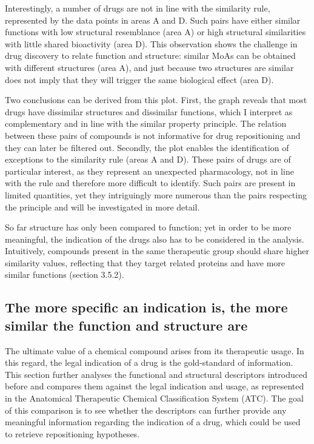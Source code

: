 Interestingly, a number of drugs are not in line with the similarity rule, represented by the data points in areas A and D. Such pairs have either similar functions with low structural resemblance (area A) or high structural similarities with little shared bioactivity (area D). This observation shows the challenge in drug discovery to relate function and structure: similar MoAs can be obtained with different structures (area A), and just because two structures are similar does not imply that they will trigger the same biological effect (area D).

Two conclusions can be derived from this plot. First, the graph reveals that most drugs have dissimilar structures and dissimilar functions, which I interpret as complementary and in line with the similar property principle. The relation between these pairs of compounds is not informative for drug repositioning and they can later be filtered out. Secondly, the plot enables the identification of exceptions to the similarity rule (areas A and D). These pairs of drugs are of particular interest, as they represent an unexpected pharmacology, not in line with the rule and therefore more difficult to identify. Such pairs are present in limited quantities, yet they intriguingly more numerous than the pairs respecting the principle and will be investigated in more detail.

So far structure has only been compared to function; yet in order to be more meaningful, the indication of the drugs also has to be considered in the analysis. Intuitively, compounds present in the same therapeutic group should share higher similarity values, reflecting that they target related proteins and have more similar functions (section 3.5.2).

\subsection{The more specific an indication is, the more similar the function and structure are}
The ultimate value of a chemical compound arises from its therapeutic usage. In this regard, the legal indication of a drug is the gold-standard of information. This section further analyses the functional and structural descriptors introduced before and compares them against the legal indication and usage, as represented in the Anatomical Therapeutic Chemical Classification System (ATC). The goal of this comparison is to see whether the descriptors can further provide any meaningful information regarding the indication of a drug, which could be used to retrieve repositioning hypotheses.

